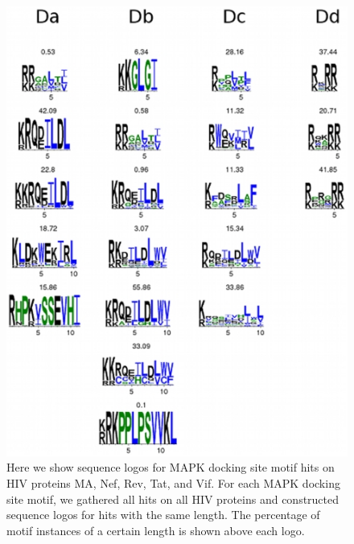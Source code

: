 \begin{figure}
\begin{center}
\includegraphics[scale=0.7]{figs/plos1_3}
\end{center}
\caption[HIV sequence logos for MAPK docking site hits]{\small Here we
  show sequence logos for MAPK docking site motif hits on HIV proteins
  MA, Nef, Rev, Tat, and Vif. For each MAPK docking site motif, we
  gathered all hits on all HIV proteins and constructed sequence logos
  for hits with the same length. The percentage of motif instances of
  a certain length is shown above each logo. \label{fig:plos1:fig3}}
\end{figure}

